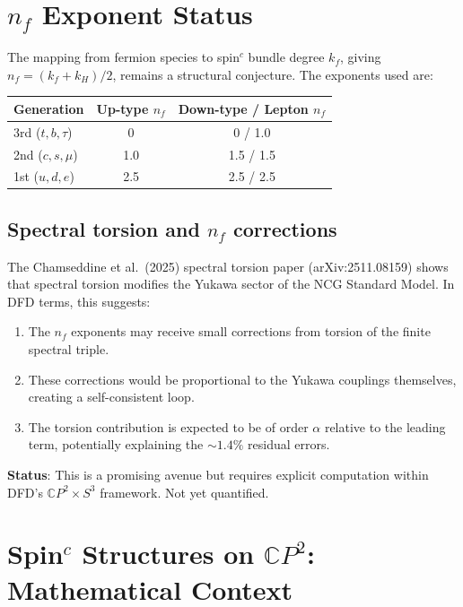 \documentclass[11pt,a4paper]{article}
\newcommand{\CP}{\mathbb{C}P}
\begin{document}
\section{$n_f$ Exponent Status}

The mapping from fermion species to spin$^c$ bundle degree $k_f$, giving $n_f = (k_f + k_H)/2$, remains a structural conjecture. The exponents used are:

\begin{center}
\begin{tabular}{lcc}
\toprule
\textbf{Generation} & \textbf{Up-type $n_f$} & \textbf{Down-type / Lepton $n_f$} \\
\midrule
3rd ($t, b, \tau$) & 0 & 0 / 1.0 \\
2nd ($c, s, \mu$) & 1.0 & 1.5 / 1.5 \\
1st ($u, d, e$) & 2.5 & 2.5 / 2.5 \\
\bottomrule
\end{tabular}
\end{center}

\subsection{Spectral torsion and $n_f$ corrections}

The Chamseddine et al.\ (2025) spectral torsion paper (arXiv:2511.08159) shows that spectral torsion modifies the Yukawa sector of the NCG Standard Model. In DFD terms, this suggests:

\begin{enumerate}
\item The $n_f$ exponents may receive small corrections from torsion of the finite spectral triple.
\item These corrections would be proportional to the Yukawa couplings themselves, creating a self-consistent loop.
\item The torsion contribution is expected to be of order $\alpha$ relative to the leading term, potentially explaining the $\sim 1.4\%$ residual errors.
\end{enumerate}

\textbf{Status}: This is a promising avenue but requires explicit computation within DFD's $\CP^2 \times S^3$ framework. Not yet quantified.

\section{Spin$^c$ Structures on $\CP^2$: Mathematical Context}
\end{document}
